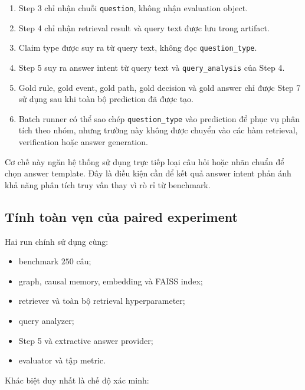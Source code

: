 \begin{enumerate}
    \item Step 3 chỉ nhận chuỗi \texttt{question}, không nhận evaluation
    object.

    \item Step 4 chỉ nhận retrieval result và query text được lưu trong
    artifact.

    \item Claim type được suy ra từ query text, không đọc
    \texttt{question\_type}.

    \item Step 5 suy ra answer intent từ query text và
    \texttt{query\_analysis} của Step 4.

    \item Gold rule, gold event, gold path, gold decision và gold answer chỉ
    được Step 7 sử dụng sau khi toàn bộ prediction đã được tạo.

    \item Batch runner có thể sao chép \texttt{question\_type} vào prediction
    để phục vụ phân tích theo nhóm, nhưng trường này không được chuyển vào
    các hàm retrieval, verification hoặc answer generation.
\end{enumerate}

Cơ chế này ngăn hệ thống sử dụng trực tiếp loại câu hỏi hoặc nhãn chuẩn để
chọn answer template. Đây là điều kiện cần để kết quả answer intent phản ánh
khả năng phân tích truy vấn thay vì rò rỉ từ benchmark.

\subsection{Tính toàn vẹn của paired experiment}

Hai run chính sử dụng cùng:

\begin{itemize}
    \item benchmark \(250\) câu;
    \item graph, causal memory, embedding và FAISS index;
    \item retriever và toàn bộ retrieval hyperparameter;
    \item query analyzer;
    \item Step 5 và extractive answer provider;
    \item evaluator và tập metric.
\end{itemize}

Khác biệt duy nhất là chế độ xác minh:

